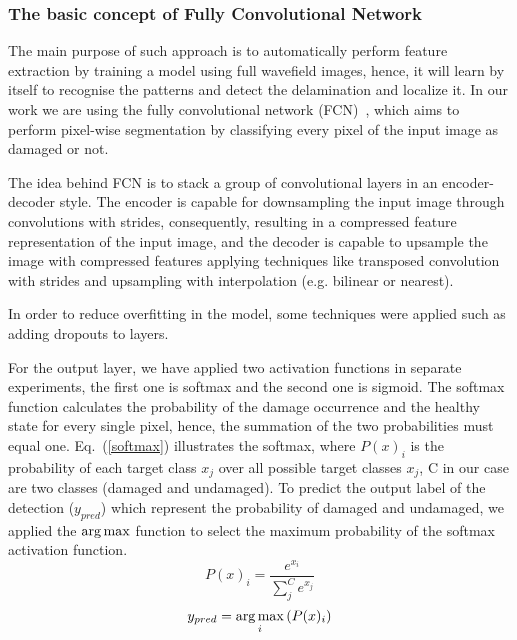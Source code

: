 \subsubsection{The basic concept of Fully Convolutional Network}
The main purpose of such approach is to automatically perform feature extraction by training a model using full wavefield images, hence, it will learn by itself to recognise the patterns and detect the delamination and localize it.
In our work we are using the fully convolutional network (FCN)~\cite{long2015fully}, which aims to perform pixel-wise segmentation by classifying every pixel of the input image as damaged or not. 

The idea behind FCN is to stack a group of convolutional layers in an encoder-decoder style. 
The encoder is capable for downsampling the input image through convolutions with strides, consequently, resulting in a compressed feature representation of the input image, and the decoder is capable to upsample the image with compressed features applying techniques like transposed convolution with strides and upsampling with interpolation (e.g. bilinear or nearest).


In order to reduce overfitting in the model, some techniques were applied such as adding dropouts to layers.

For the output layer, we have applied two activation functions in separate experiments, the first one is softmax and the second one is sigmoid. 
The softmax function calculates the probability of the damage occurrence and the healthy state for every single pixel, hence, the summation of the two probabilities must equal one. Eq.~(\ref{softmax}) illustrates the softmax, where \(P(x)_{i}\) is the probability of each target class \(x_{j}\) over all possible target classes \(x_{j}\), C in our case are two classes  (damaged and undamaged).
To predict the output label of the detection (\(y_{pred}\)) which represent the probability of damaged and undamaged, we applied the \(\operatorname*{arg\,max}\) function to select the maximum probability of the softmax activation function.
	\begin{equation}
		P(x)_{i} = \frac{e^{x_{i}}}{\sum_{j}^{C} e^{x_{j}}}
		\label{softmax}
	\end{equation} 
	\begin{equation}
		y_{pred} = \operatorname*{arg\,max}_{i}\left( P(x)_{i} \right)
		\label{argmax}
	\end{equation}

